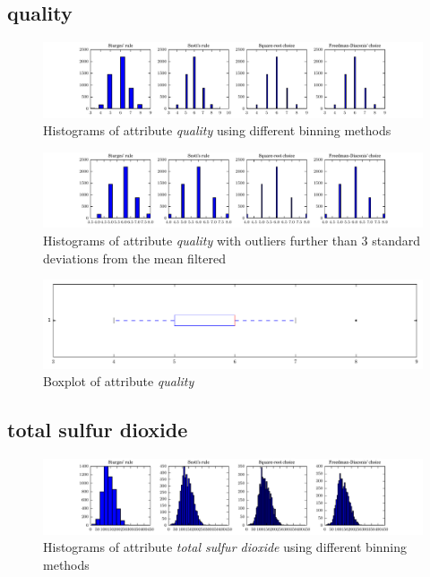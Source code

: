 \documentclass{report}
\begin{document}
\newpage\subsection{quality}
\begin{figure}[H]
\includegraphics[width=\textwidth]{histograms/quality.pdf}
\caption{Histograms of attribute \emph{quality} using different binning methods}\end{figure}

\begin{figure}[H]
\includegraphics[width=\textwidth]{histograms/quality_filtered.pdf}
\caption{Histograms of attribute \emph{quality} with outliers further than 3 standard deviations from the mean filtered}\n\end{figure}

\begin{figure}[H]
\includegraphics[width=\textwidth]{boxplots/quality.pdf}
\caption{Boxplot of attribute \emph{quality}}\end{figure}

\newpage\subsection{total sulfur dioxide}
\begin{figure}[H]
\includegraphics[width=\textwidth]{histograms/total_sulfur_dioxide.pdf}
\caption{Histograms of attribute \emph{total sulfur dioxide} using different binning methods}\end{figure}
\end{document}
